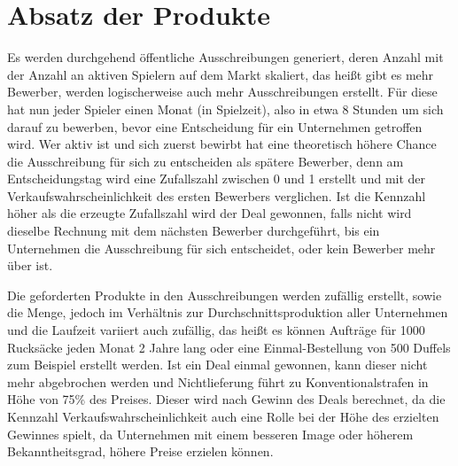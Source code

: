 \section{Absatz der Produkte}
Es werden durchgehend öffentliche Ausschreibungen generiert, deren Anzahl mit der Anzahl an aktiven Spielern auf dem Markt skaliert, das heißt gibt es mehr Bewerber, werden logischerweise auch mehr Ausschreibungen erstellt. Für diese hat nun jeder Spieler einen Monat (in Spielzeit), also in etwa 8 Stunden um sich darauf zu bewerben, bevor eine Entscheidung für ein Unternehmen getroffen wird. Wer aktiv ist und sich zuerst bewirbt hat eine theoretisch höhere Chance die Ausschreibung für sich zu entscheiden als spätere Bewerber, denn am Entscheidungstag wird eine Zufallszahl zwischen 0 und 1 erstellt und mit der Verkaufswahrscheinlichkeit des ersten Bewerbers verglichen. Ist die Kennzahl höher als die erzeugte Zufallszahl wird der Deal gewonnen, falls nicht wird dieselbe Rechnung mit dem nächsten Bewerber durchgeführt, bis ein Unternehmen die Ausschreibung für sich entscheidet, oder kein Bewerber mehr über ist. 

Die geforderten Produkte in den Ausschreibungen werden zufällig erstellt, sowie die Menge, jedoch im Verhältnis zur Durchschnittsproduktion aller Unternehmen und die Laufzeit variiert auch zufällig, das heißt es können Aufträge für 1000 Rucksäcke jeden Monat 2 Jahre lang oder eine Einmal-Bestellung von 500 Duffels zum Beispiel erstellt werden. Ist ein Deal einmal gewonnen, kann dieser nicht mehr abgebrochen werden und Nichtlieferung führt zu Konventionalstrafen in Höhe von 75\% des Preises. Dieser wird nach Gewinn des Deals berechnet, da die Kennzahl Verkaufswahrscheinlichkeit auch eine Rolle bei der Höhe des erzielten Gewinnes spielt, da Unternehmen mit einem besseren Image oder höherem Bekanntheitsgrad, höhere Preise erzielen können. 

